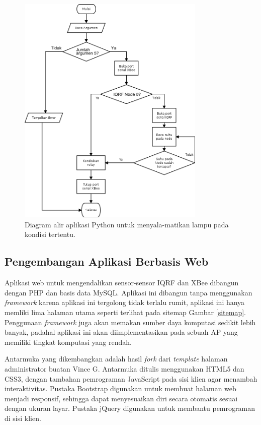 \begin{enumerate}
					\begin{figure}[H]
					  \centering
					    \includegraphics[width=0.8\textwidth]{gambar/python-profile}
					    \caption{Diagram alir aplikasi Python untuk menyala-matikan lampu pada kondisi tertentu.}
					    \label{python-profile}
					\end{figure}

			\end{enumerate}

		\subsection{Pengembangan Aplikasi Berbasis Web}
			Aplikasi web untuk mengendalikan sensor-sensor IQRF dan XBee dibangun dengan PHP dan basis data MySQL. Aplikasi ini dibangun tanpa menggunakan \emph{framework} karena aplikasi ini tergolong tidak terlalu rumit, aplikasi ini hanya memliki lima halaman utama seperti terlihat pada sitemap Gambar \ref{sitemap}. Penggunaan \emph{framework} juga akan memakan sumber daya komputasi sedikit lebih banyak, padahal aplikasi ini akan diimplementasikan pada sebuah AP yang memiliki tingkat komputasi yang rendah.

			Antarmuka yang dikembangkan adalah hasil \emph{fork} dari \emph{template} halaman administrator buatan Vince G. Antarmuka ditulis menggunakan HTML5 dan CSS3, dengan tambahan pemrograman JavaScript pada sisi klien agar menambah interaktivitas. Pustaka Bootstrap digunakan untuk membuat halaman web menjadi responsif, sehingga dapat menyesuaikan diri secara otomatis sesuai dengan ukuran layar. Pustaka jQuery digunakan untuk membantu pemrograman di sisi klien.

